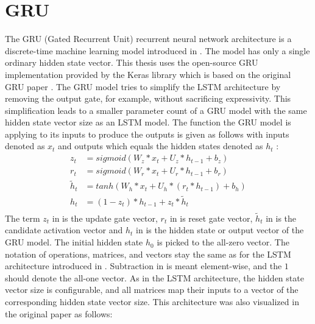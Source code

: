 \documentclass[draft,final]{vutinfth} %
\begin{document}
    \section{GRU} \label{gru}
    The GRU (Gated Recurrent Unit) recurrent neural network architecture is a discrete-time machine learning model introduced in .
    The model has only a single ordinary hidden state vector.
    This thesis uses the open-source GRU implementation provided by the Keras library \cite{Keras} which is based on the original GRU paper \cite{GRU}.
    The GRU model tries to simplify the LSTM architecture by removing the output gate, for example, without sacrificing expressivity.
    This simplification leads to a smaller parameter count of a GRU model with the same hidden state vector size as an LSTM model.
    The function the GRU model is applying to its inputs to produce the outputs is given as follows with inputs denoted as $x_t$ and outputs which equals the hidden states denoted as $h_t$ \cite[p. 4]{GRU}:
    \begin{align}
        \label{update_gate} z_t &= sigmoid(W_z*x_t + U_z*h_{t-1} + b_z) \\
        \label{reset_gate} r_t &= sigmoid(W_r*x_t + U_r*h_{t-1} + b_r) \\
        \label{candidate_activation_vector} \tilde{h}_t &= tanh(W_h*x_t + U_h*(r_t * h_{t-1}) + b_h) \\
        \label{output_vector} h_t &= (1 - z_t) * h_{t-1} + z_t * \tilde{h}_t \\
    \end{align}
    The term $z_t$ in  is the update gate vector, $r_t$ in  is reset gate vector, $\tilde{h}_t$ in  is the candidate activation vector and $h_t$ in  is the hidden state or output vector of the GRU model.
    The initial hidden state $h_0$ is picked to the all-zero vector.
    The notation of operations, matrices, and vectors stay the same as for the LSTM architecture introduced in .
    Subtraction in  is meant element-wise, and the $1$ should denote the all-one vector.
    As in the LSTM architecture, the hidden state vector size is configurable, and all matrices map their inputs to a vector of the corresponding hidden state vector size.
    This architecture was also visualized in the original paper as follows:
\end{document}
